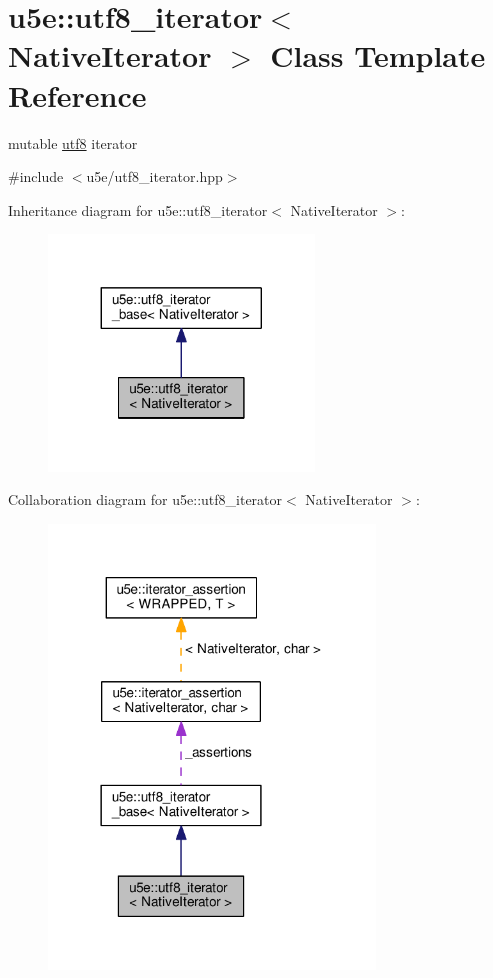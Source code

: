 \hypertarget{classu5e_1_1utf8__iterator}{}\section{u5e\+:\+:utf8\+\_\+iterator$<$ Native\+Iterator $>$ Class Template Reference}
\label{classu5e_1_1utf8__iterator}


mutable \hyperlink{classu5e_1_1utf8}{utf8} iterator  




{\ttfamily \#include $<$u5e/utf8\+\_\+iterator.\+hpp$>$}



Inheritance diagram for u5e\+:\+:utf8\+\_\+iterator$<$ Native\+Iterator $>$\+:
\nopagebreak
\begin{figure}[H]
\begin{center}
\leavevmode
\includegraphics[width=200pt]{classu5e_1_1utf8__iterator__inherit__graph}
\end{center}
\end{figure}


Collaboration diagram for u5e\+:\+:utf8\+\_\+iterator$<$ Native\+Iterator $>$\+:
\nopagebreak
\begin{figure}[H]
\begin{center}
\leavevmode
\includegraphics[width=246pt]{classu5e_1_1utf8__iterator__coll__graph}
\end{center}
\end{figure}
